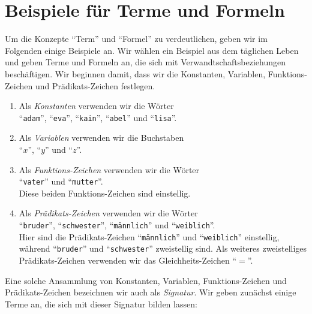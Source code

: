 \section{Beispiele f\"ur Terme und Formeln}
Um die Konzepte ``Term'' und ``Formel'' zu verdeutlichen, geben wir im Folgenden einige
Beispiele an.  Wir w\"ahlen ein Beispiel aus dem t\"aglichen Leben und geben Terme und Formeln an, die sich mit
Verwandtschaftsbeziehungen besch\"aftigen.  Wir beginnen damit, dass wir die Konstanten,
Variablen, Funktions-Zeichen und Pr\"adikats-Zeichen festlegen.
\begin{enumerate}
\item Als \emph{Konstanten} verwenden wir die W\"orter \\[0.2cm]
      \hspace*{1.3cm} ``\texttt{adam}'', ``\texttt{eva}'', ``\texttt{kain}'', ``\texttt{abel}'' und
      ``\texttt{lisa}''.
\item Als \emph{Variablen} verwenden wir die Buchstaben \\[0.2cm]
      \hspace*{1.3cm} ``$x$'', ``$y$'' und ``$z$''.
\item Als \emph{Funktions-Zeichen} verwenden wir die W\"orter \\[0.2cm]
      \hspace*{1.3cm} ``\texttt{vater}'' und ``\texttt{mutter}''. \\[0.2cm]
      Diese beiden Funktions-Zeichen sind einstellig. 
\item Als \emph{Pr\"adikats-Zeichen} verwenden wir die W\"orter \\[0.2cm]
      \hspace*{1.3cm} ``\texttt{bruder}'', ``\texttt{schwester}'', 
      ``\texttt{m\"annlich}'' und ``\texttt{weiblich}''. \\[0.2cm]
      Hier sind die Pr\"adikats-Zeichen ``\texttt{m\"annlich}'' und ``\texttt{weiblich}'' einstellig,
      w\"ahrend ``\texttt{bruder}'' und ``\texttt{schwester}'' zweistellig sind. 
      Als weiteres zweistelliges Pr\"adikats-Zeichen verwenden wir das Gleichheits-Zeichen ``$=$''.
\end{enumerate}
Eine solche Ansammlung von Konstanten,
Variablen, Funktions-Zeichen und Pr\"adikats-Zeichen bezeichnen wir auch als
\emph{Signatur}.  Wir geben zun\"achst einige Terme an, die sich mit dieser Signatur
bilden lassen:
